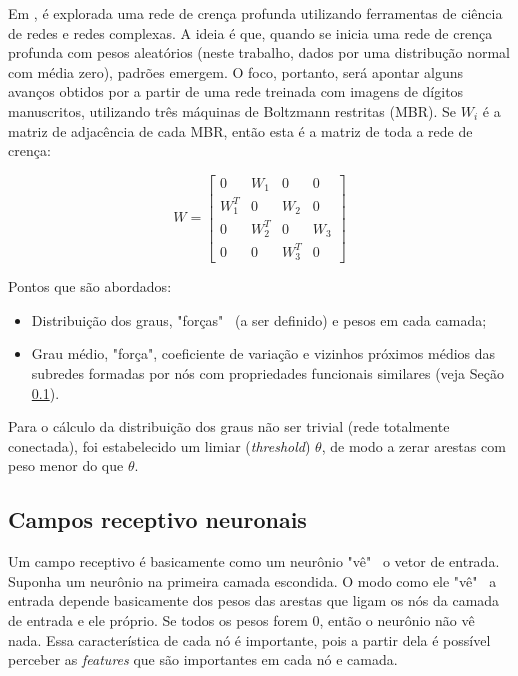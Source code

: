 \documentclass{article}
\begin{document}
        Em \cite{testolin2018deep}, é explorada uma rede de crença profunda utilizando ferramentas de ciência de redes e redes complexas.
        A ideia é que, quando se inicia uma rede de crença profunda com pesos aleatórios (neste trabalho, dados por uma distribução normal com média zero), padrões emergem.
        O foco, portanto, será apontar alguns avanços obtidos por \cite{testolin2018deep} a partir de uma rede treinada com imagens de dígitos manuscritos, utilizando três máquinas de Boltzmann restritas (MBR).
        Se $W_i$ é a matriz de adjacência de cada MBR, então esta é a matriz de toda a rede de crença:

        \begin{equation}
            W = \begin{bmatrix}
                    0 & W_1 & 0 & 0 \\
                    W_1^T & 0 & W_2 & 0 \\
                    0 & W_2^T & 0 & W_3 \\
                    0 & 0 & W_3^T & 0
                \end{bmatrix}
        \end{equation}

        Pontos que são abordados:
        
        \begin{itemize}
            \item Distribuição dos graus, "forças" \ (a ser definido) e pesos em cada camada;
            \item Grau médio, "força", coeficiente de variação e vizinhos próximos médios das subredes formadas por nós com propriedades funcionais similares (veja Seção \ref{field}).
        \end{itemize}

        Para o cálculo da distribuição dos graus não ser trivial (rede totalmente conectada), foi estabelecido um limiar (\textit{threshold}) $\theta$, de modo a zerar arestas com peso menor do que $\theta$.

        \subsection{Campos receptivo neuronais}
            \label{field}

            Um campo receptivo é basicamente como um neurônio "vê" \ o vetor de entrada.
            Suponha um neurônio na primeira camada escondida.
            O modo como ele "vê" \ a entrada depende basicamente dos pesos das arestas que ligam os nós da camada de entrada e ele próprio.
            Se todos os pesos forem $0$, então o neurônio não vê nada.
            Essa característica de cada nó é importante, pois a partir dela é possível perceber as \textit{features} que são importantes em cada nó e camada.
\end{document}
